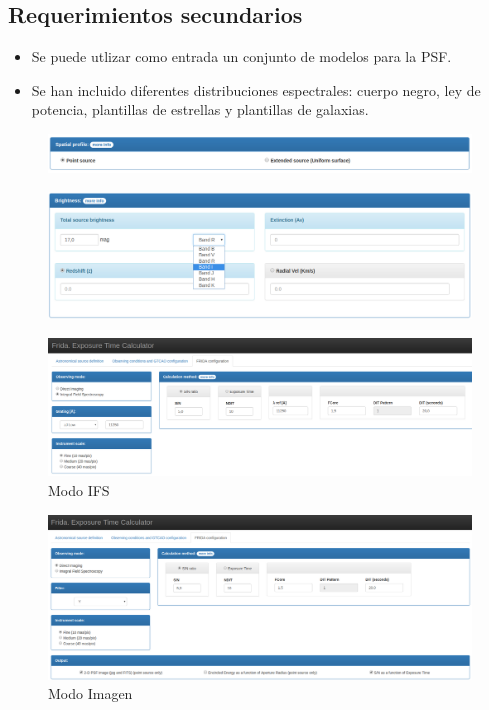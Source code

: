 \subsection{Requerimientos secundarios}
\begin{itemize}
    \item Se puede utlizar como entrada un conjunto de modelos para la PSF.
    \item Se han incluido diferentes distribuciones espectrales: cuerpo negro, ley de potencia, plantillas de estrellas y plantillas de galaxias.
\end{itemize}
\begin{figure}[h]
    \centering
    \includegraphics[scale=0.3]{figs/spatial-profile}
    \label{fig:spatial}
\end{figure}
\begin{figure}[h]
    \centering
    \includegraphics[scale=0.3]{figs/brightness}
    \label{fig:brightness}
\end{figure}
\begin{figure}[h]
    \centering
    \includegraphics[scale=0.2]{figs/ifs-mode}
    \caption{Modo IFS}
    \label{fig:ifs-mode}
\end{figure}
\begin{figure}[h]
    \centering
    \includegraphics[scale=0.2]{figs/image-mode}
    \caption{Modo Imagen}
    \label{fig:image-mode}
\end{figure}

